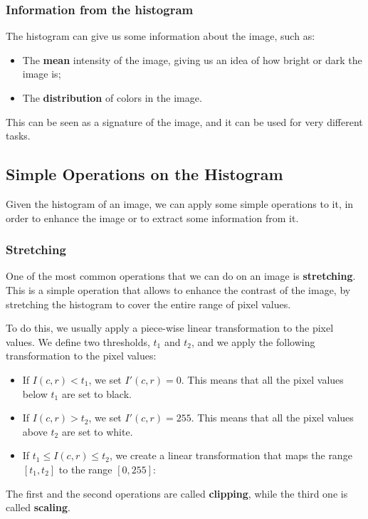 \subsubsection{Information from the histogram}
The histogram can give us some information about the image, such as:
\begin{itemize}
    \item The \textbf{mean} intensity of the image, giving us an idea of how bright or dark the image is;
    \item The \textbf{distribution} of colors in the image.
\end{itemize}
This can be seen as a signature of the image, and it can be used for very different tasks.

\subsection{Simple Operations on the Histogram}
Given the histogram of an image, we can apply some simple operations to it, in order to enhance the image or to extract some information from it.

\subsubsection{Stretching}
One of the most common operations that we can do on an image is \textbf{stretching}.
This is a simple operation that allows to enhance the contrast of the image, by stretching the histogram to cover the entire range of pixel values.

To do this, we usually apply a piece-wise linear transformation to the pixel values.
We define two thresholds, $t_1$ and $t_2$, and we apply the following transformation to the pixel values:
\begin{itemize}
    \item If $I(c,r) < t_1$, we set $I'(c,r) = 0$. This means that all the pixel values below $t_1$ are set to black.
    \item If $I(c,r) > t_2$, we set $I'(c,r) = 255$. This means that all the pixel values above $t_2$ are set to white.
    \item If $t_1 \leq I(c,r) \leq t_2$, we create a linear transformation that maps the range $[t_1, t_2]$ to the range $[0, 255]$:
\end{itemize}
The first and the second operations are called \textbf{clipping}, while the third one is called \textbf{scaling}.

